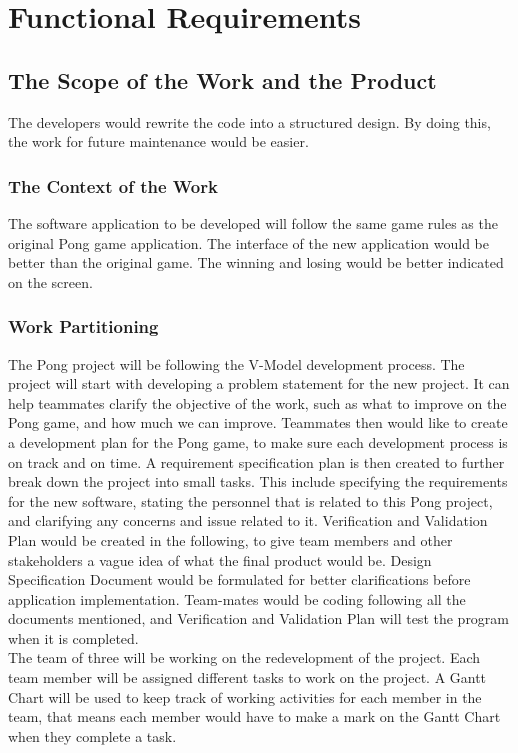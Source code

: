 \documentclass[12pt,letterpaper]{article}
\begin{document}
	
	\section{Functional Requirements}

	\subsection{The Scope of the Work and the Product}
The developers would rewrite the code into a structured design. By doing this, the work for future maintenance would be easier.
	\subsubsection{The Context of the Work}
The software application to be developed will follow the same game rules as the original Pong game application. The interface of the new application would be better than the original game. The winning and losing would be better indicated on the screen.
	\subsubsection{Work Partitioning}
	The Pong project will be following the V-Model development process. The project will start with developing a problem statement for the new project. It can help teammates clarify the objective of the work, such as what to improve on the Pong game, and how much we can improve. Teammates then would like to create a development plan for the Pong game, to make sure each development process is on track and on time. A requirement specification plan is then created to further break down the project into small tasks. This include specifying the requirements for the new software, stating the personnel that is related to this Pong project, and clarifying any concerns and issue related to it. Verification and Validation Plan would be created in the following, to give team members and other stakeholders a vague idea of what the final product would be. Design Specification Document would be formulated for better clarifications before application implementation. Team-mates would be coding following all the documents mentioned, and Verification and Validation Plan will test the program when it is completed.\\

\noindent The team of three will be working on the redevelopment of the project. Each team member will be assigned different tasks to work on the project. A Gantt Chart will be used to keep track of working activities for each member in the team, that means each member would have to make a mark on the Gantt Chart when they complete a task. \\
\end{document}

